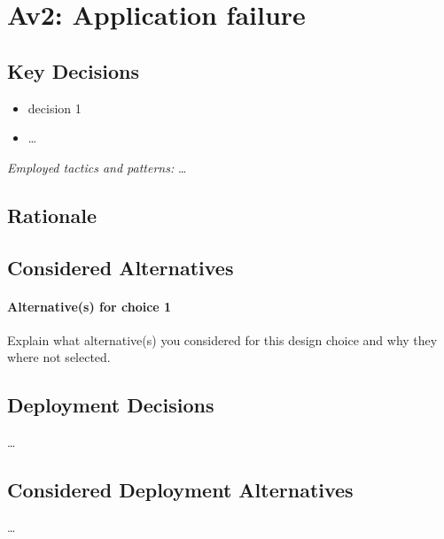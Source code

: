 \section{Av2: Application failure}


    \subsection*{Key Decisions}


        \begin{itemize}
        	\item decision 1
        	\item \ldots
        \end{itemize}
        \emph{Employed tactics and patterns:} \ldots

    \subsection*{Rationale}

    \subsection*{Considered Alternatives}
        \paragraph{Alternative(s) for choice 1} Explain what alternative(s) you
        considered for this design choice and why they where not selected.

    \subsection*{Deployment Decisions}
        \ldots

    \subsection*{Considered Deployment Alternatives}
        \ldots
